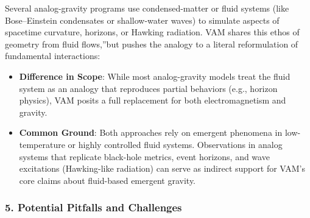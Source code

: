 \documentclass[a4paper,12pt]{article}
\begin{document}
Several analog-gravity programs use condensed-matter or fluid systems (like Bose–Einstein condensates or shallow-water waves) to simulate aspects of spacetime curvature, horizons, or Hawking radiation. VAM shares this ethos of \grqq geometry from fluid flows,\textquotedblright but pushes the analogy to a literal reformulation of fundamental interactions:

\begin{itemize}
    \item \textbf{Difference in Scope}: While most analog-gravity models treat the fluid system as an analogy that reproduces partial behaviors (e.g., horizon physics), VAM posits a full replacement for both electromagnetism and gravity.
    \item \textbf{Common Ground}: Both approaches rely on emergent phenomena in low-temperature or highly controlled fluid systems. Observations in analog systems that replicate black-hole metrics, event horizons, and wave excitations (Hawking-like radiation) can serve as indirect support for VAM's core claims about fluid-based emergent gravity.
\end{itemize}

\subsubsection*{5. Potential Pitfalls and Challenges}
\end{document}
